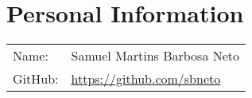 \section{Personal Information}

\begin{tabularx}{\textwidth}{Ll}
Name: & Samuel Martins Barbosa Neto\\
GitHub: & \url{https://github.com/sbneto}\\
\end{tabularx}